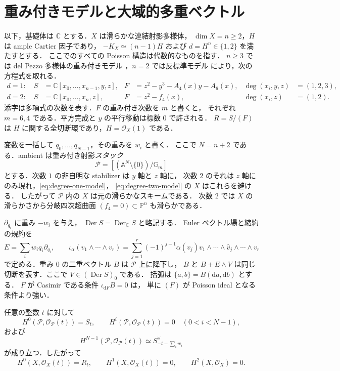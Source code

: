 \section{重み付きモデルと大域的多重ベクトル}
\label{sec:models}

以下，基礎体は $\mathbb C$ とする．$X$ は滑らかな連結射影多様体，
$\dim X=n\geq 2$，$H$ は ample Cartier 因子であり，
$-K_X\simeq (n-1)H$ および $d=H^n\in\{1,2\}$ を満たすとする．
ここでのすべての Poisson 構造は代数的なものを指す．
$n\geq3$ では del Pezzo 多様体の重み付きモデル
\cite[Theorem 1.2]{KP2023}，$n=2$ では反標準モデル
\cite[Theorem 2.5]{CP2021} により，次の方程式を取れる．
\begin{align}
 d=1:\quad
 S&=\mathbb C[x_0,\ldots,x_{n-1},y,z],
 &F&=z^2-y^3-A_4(x)y-A_6(x),
 &\deg(x_i,y,z)&=(1,2,3),
 \label{eq:degree-one-model}\\
 d=2:\quad
 S&=\mathbb C[x_0,\ldots,x_n,z],
 &F&=z^2-f_4(x),
 &\deg(x_i,z)&=(1,2).
 \label{eq:degree-two-model}
\end{align}
添字は多項式の次数を表す．$F$ の重み付き次数を $m$ と書くと，
それぞれ $m=6,4$ である．平方完成と $y$ の平行移動は標数 $0$ で許される．
$R=S/(F)$ は $H$ に関する全切断環であり，$H=\mathcal O_X(1)$ である．

変数を一括して $q_0,\ldots,q_{N-1}$，その重みを $w_i$ と書く．
ここで $N=n+2$ である．ambient は重み付き射影\emph{スタック}
\[
 \mathcal P=[(\mathbb A^N\setminus\{0\})/\mathbb G_m]
\]
とする．次数 $1$ の非自明な stabilizer は $y$ 軸と $z$ 軸に，
次数 $2$ のそれは $z$ 軸にのみ現れ，\eqref{eq:degree-one-model}，
\eqref{eq:degree-two-model} の $X$ はこれらを避ける．
したがって $\mathcal P$ 内の $X$ は元の滑らかなスキームである．
次数 $2$ では $X$ の滑らかさから分岐四次超曲面
$(f_4=0)\subset\mathbb P^n$ も滑らかである．

$\partial_{q_i}$ に重み $-w_i$ を与え，
$\operatorname{Der}S=\operatorname{Der}_{\mathbb C}S$ と略記する．
Euler ベクトル場と縮約の規約を
\[
 E=\sum_i w_iq_i\partial_{q_i},\qquad
 \iota_\alpha(v_1\wedge\cdots\wedge v_r)
 =\sum_{j=1}^r(-1)^{j-1}\alpha(v_j)
 v_1\wedge\cdots\wedge\widehat v_j\wedge\cdots\wedge v_r
\]
で定める．重み $0$ の二重ベクトル $B$ は $\mathcal P$ 上に降下し，
$B$ と $B+E\wedge V$ は同じ切断を表す．ここで $V\in(\operatorname{Der}S)_0$ である．
括弧は $\{a,b\}=B(\mathrm da,\mathrm db)$ とする．
$F$ が Casimir である条件 $\iota_{\mathrm dF}B=0$ は，
単に $(F)$ が Poisson ideal となる条件より強い．

\begin{lemma}[必要な消滅]
\label{lemma:weighted-vanishing}
任意の整数 $t$ に対して
\[
 H^0(\mathcal P,\mathcal O_{\mathcal P}(t))=S_t,
 \qquad
 H^i(\mathcal P,\mathcal O_{\mathcal P}(t))=0
 \quad(0<i<N-1),
\]
および
\[
 H^{N-1}(\mathcal P,\mathcal O_{\mathcal P}(t))
 \simeq S_{-t-\sum_iw_i}^{\vee}
\]
が成り立つ．したがって
\[
 H^0(X,\mathcal O_X(t))=R_t,\qquad
 H^1(X,\mathcal O_X(t))=0,\qquad H^2(X,\mathcal O_X)=0.
\]
\end{lemma}

